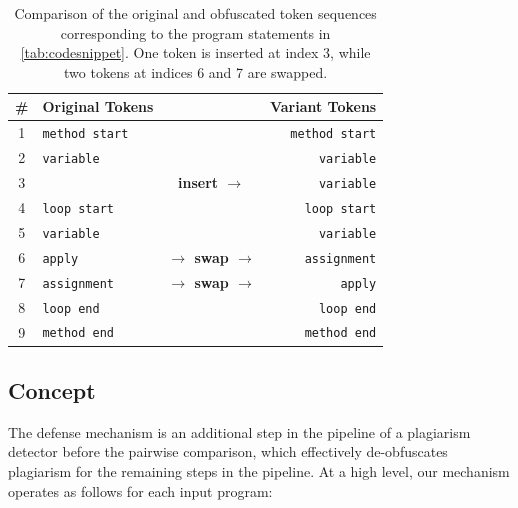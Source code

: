 \begin{samepage}
\begin{table}
    \centering
    \begin{tabular}{c@{\hskip 15pt}l@{\hskip 30pt}c@{\hskip 30pt} r}
        \toprule
        \# & \textbf{Original Tokens}     &                     & \textbf{Variant Tokens}      \\
        \midrule
        1  & \texttt{method start} &                 & \texttt{method start} \\
        2  & \texttt{variable}     &                 & \texttt{variable}     \\
        3  &                       & \textbf{\phantom{$\to$}  insert $\to$}    & \cellcolor{add}\texttt{variable}     \\
        4  & \texttt{loop start}   &                 & \texttt{loop start}   \\
        5  & \texttt{variable}     &                 & \texttt{variable}     \\
        6  & \cellcolor{del}\texttt{apply}        & \textbf{$\to$  swap $\to$} & \cellcolor{add}\texttt{assignment}   \\
        7  & \cellcolor{del}\texttt{assignment}   & \textbf{$\to$  swap $\to$} & \cellcolor{add}\texttt{apply}        \\
        8  & \texttt{loop end}     &                 & \texttt{loop end}     \\
        9  & \texttt{method end}   &                 & \texttt{method end}   \\
        \bottomrule
    \end{tabular}
    \caption[Example Obfuscation Tokens: Insertion and Reordering]{Comparison of the original and obfuscated token sequences corresponding to the program statements in \autoref{tab:codesnippet}. One token is inserted at index 3, while two tokens at indices 6 and 7 are swapped.}
    \label{tab:tokens}
\end{table}
\end{samepage}

\subsection{Concept}

The defense mechanism is an additional step in the pipeline of a plagiarism detector before the pairwise comparison, which effectively de-obfuscates plagiarism for the remaining steps in the pipeline.
At a high level, our mechanism operates as follows for each input program:

